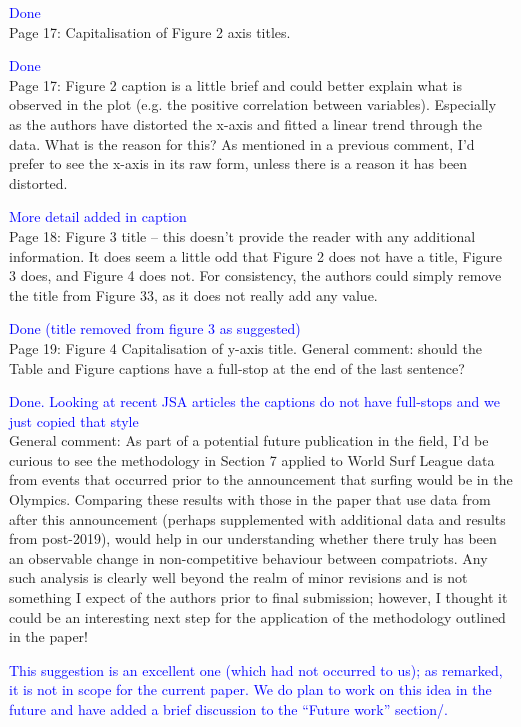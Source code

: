 \documentclass[12pt]{article}
\begin{document}
\textcolor{blue}{Done}\\

Page 17: Capitalisation of Figure 2 axis titles.

\textcolor{blue}{Done}\\

Page 17: Figure 2 caption is a little brief and could better explain
what is observed in the plot (e.g. the positive correlation between
variables). Especially as the authors have distorted the x-axis and
fitted a linear trend through the data. What is the reason for this?
As mentioned in a previous comment, I’d prefer to see the x-axis in
its raw form, unless there is a reason it has been distorted.

\textcolor{blue}{More detail added in caption}\\



Page 18: Figure 3 title – this doesn’t provide the reader with any
additional information. It does seem a little odd that Figure 2 does
not have a title, Figure 3 does, and Figure 4 does not. For
consistency, the authors could simply remove the title from Figure 33,
as it does not really add any value.

\textcolor{blue}{Done (title removed from figure 3 as suggested)}\\

Page 19: Figure 4 Capitalisation of y-axis title.  General comment:
should the Table and Figure captions have a full-stop at the end of
the last sentence?

\textcolor{blue}{Done.  Looking at recent JSA articles the captions do
  not have full-stops and we just copied that style}\\


General comment: As part of a potential future publication in the
field, I'd be curious to see the methodology in Section 7 applied to
World Surf League data from events that occurred prior to the
announcement that surfing would be in the Olympics.  Comparing these
results with those in the paper that use data from after this
announcement (perhaps supplemented with additional data and results
from post-2019), would help in our understanding whether there truly
has been an observable change in non-competitive behaviour between
compatriots.  Any such analysis is clearly well beyond the realm of
minor revisions and is not something I expect of the authors prior to
final submission; however, I thought it could be an interesting next
step for the application of the methodology outlined in the paper!

\textcolor{blue}{This suggestion is an excellent one (which had not
  occurred to us); as remarked, it is not in scope for the current
  paper.  We do plan to work on this idea in the future and have added
  a brief discussion to the ``Future work'' section/.
}
\end{document}
